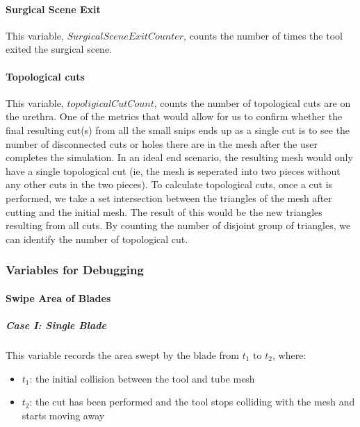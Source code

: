 \paragraph{Surgical Scene Exit}
\label{para:data_surgical_scene_exit}

This variable, $SurgicalSceneExitCounter$, counts the number of times the tool exited the surgical scene.

\paragraph{Topological cuts}
\label{para:data_counters_topological_cuts}

This variable, $topoligicalCutCount$, counts the number of topological cuts are on the urethra. One of the metrics that would allow for us to confirm whether the final resulting cut(s) from all the small snips ends up as a single cut is to see the number of disconnected cuts or holes there are in the mesh after the user completes the simulation. In an ideal end scenario, the resulting mesh would only have a single topological cut (ie, the mesh is seperated into two pieces without any other cuts in the two pieces). To calculate topological cuts, once a cut is performed, we take a set intersection between the triangles of the mesh after cutting and the initial mesh. The result of this would be the new triangles resulting from all cuts. By counting the number of disjoint group of triangles, we can identify the number of topological cut.

\subsubsection{Variables for Debugging}

\paragraph{Swipe Area of Blades}
\label{para:data_swipe_area_of_blades}

\subparagraph{Case I: Single Blade}

This variable records the area swept by the blade from $t_1$ to $t_2$, where:

\begin{itemize}
  \item $t_1$: the initial collision between the tool and tube mesh
  \item $t_2$: the cut has been performed and the tool stops colliding with the mesh and starts moving away
\end{itemize}

